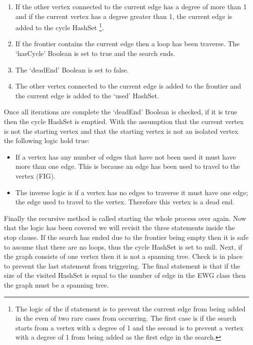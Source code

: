 \documentclass{AISB2008}
\begin{document}
\begin{enumerate}
\item If the other vertex connected to the current edge has a degree of more than 1 and if the current vertex has a degree greater than 1, the current edge is added to the cycle HashSet \footnote{The logic of the if statement is to prevent the current edge from being added in the even of two rare cases from occurring. The first case is if the search starts from a vertex with a degree of 1 and the second is to prevent a vertex with a degree of 1 from being added as the first edge in the search.}.
\item If the frontier contains the current edge then a loop has been traverse. The ‘hasCycle’ Boolean is set to true and the search ends.
\item The ‘deadEnd’ Boolean is set to false.
\item The other vertex connected to the current edge is added to the frontier and the current edge is added to the ‘used’ HashSet.
\end{enumerate}

Once all iterations are complete the ‘deadEnd’ Boolean is checked, if it is true then the cycle HashSet is emptied. With the assumption that the current vertex is not the starting vertex and that the starting vertex is not an isolated vertex the following logic hold true:

\begin{itemize}
\item If a vertex has any number of edges that have not been used it must have more than one edge. This is because an edge has been used to travel to the vertex (FIG). 
\item The inverse logic is if a vertex has no edges to traverse it must have one edge; the edge used to travel to the vertex. Therefore this vertex is a dead end.
\end{itemize}

Finally the recursive method is called starting the whole process over again. Now that the logic has been covered we will revisit the three statements inside the stop clause. If the search has ended due to the frontier being empty then it is safe to assume that there are no loops, thus the cycle HashSet is set to null. Next, if the graph consists of one vertex then it is not a spanning tree. Check is in place to prevent the last statement from triggering. The final statement is that if the size of the visited HashSet is equal to the number of edge in the EWG class then the graph must be a spanning tree.
\end{document}
